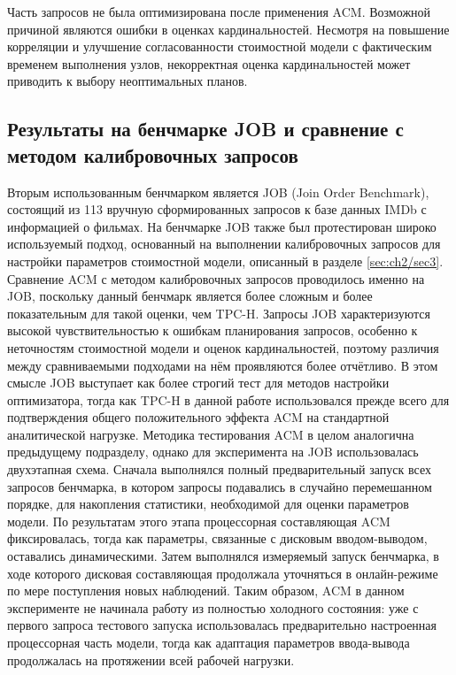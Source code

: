 Часть запросов не была оптимизирована после применения ACM. Возможной причиной являются ошибки в оценках кардинальностей. Несмотря на повышение корреляции и улучшение согласованности стоимостной модели с фактическим временем выполнения узлов, некорректная оценка кардинальностей может приводить к выбору неоптимальных планов.

\subsection{Результаты на бенчмарке JOB и сравнение с методом калибровочных запросов}\label{sec2:job_tests}

Вторым использованным бенчмарком является JOB (Join Order Benchmark), состоящий из 113 вручную сформированных запросов к базе данных IMDb с информацией о фильмах. На бенчмарке JOB также был протестирован широко используемый подход, основанный на выполнении калибровочных запросов для настройки параметров стоимостной модели, описанный в разделе \ref{sec:ch2/sec3}. Сравнение ACM с методом калибровочных запросов проводилось именно на JOB, поскольку данный бенчмарк является более сложным и более показательным для такой оценки, чем TPC-H. Запросы JOB характеризуются высокой чувствительностью к ошибкам планирования запросов, особенно к неточностям стоимостной модели и оценок кардинальностей, поэтому различия между сравниваемыми подходами на нём проявляются более отчётливо. В этом смысле JOB выступает как более строгий тест для методов настройки оптимизатора, тогда как TPC-H в данной работе использовался прежде всего для подтверждения общего положительного эффекта ACM на стандартной аналитической нагрузке. Методика тестирования ACM в целом аналогична предыдущему подразделу, однако для эксперимента на JOB использовалась двухэтапная схема. Сначала выполнялся полный предварительный запуск всех запросов бенчмарка, в котором запросы подавались в случайно перемешанном порядке, для накопления статистики, необходимой для оценки параметров модели. По результатам этого этапа процессорная составляющая ACM фиксировалась, тогда как параметры, связанные с дисковым вводом-выводом, оставались динамическими. Затем выполнялся измеряемый запуск бенчмарка, в ходе которого дисковая составляющая продолжала уточняться в онлайн-режиме по мере поступления новых наблюдений. Таким образом, ACM в данном эксперименте не начинала работу из полностью холодного состояния: уже с первого запроса тестового запуска использовалась предварительно настроенная процессорная часть модели, тогда как адаптация параметров ввода-вывода продолжалась на протяжении всей рабочей нагрузки.

